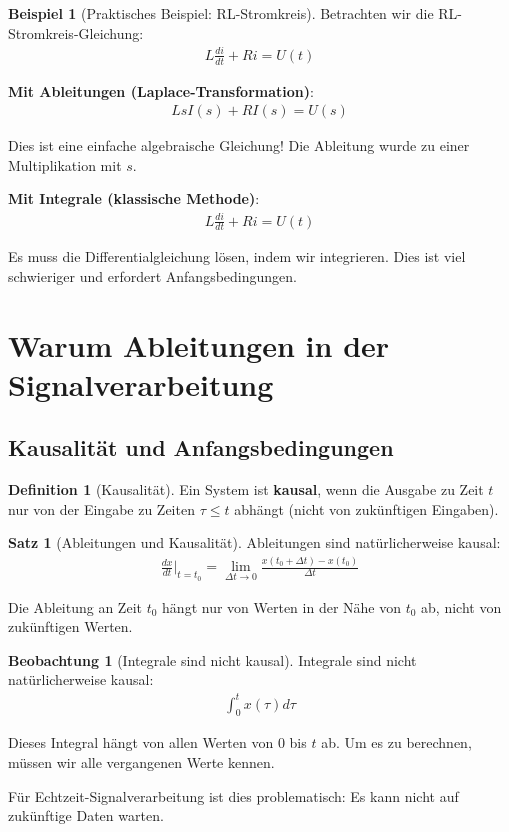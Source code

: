 ﻿\documentclass[a4paper,12pt]{report}
\theoremstyle{definition}
\newtheorem{definition}{Definition}
\newtheorem{beispiel}{Beispiel}
\newtheorem{satz}{Satz}
\newtheorem{beobachtung}{Beobachtung}
\begin{document}
	\begin{beispiel}[Praktisches Beispiel: RL-Stromkreis]
		Betrachten wir die RL-Stromkreis-Gleichung:
		\begin{align}
			L \frac{di}{dt} + R i = U(t)
		\end{align}
		
		\textbf{Mit Ableitungen (Laplace-Transformation)}:
		\begin{align}
			L s I(s) + R I(s) = U(s)
		\end{align}
		
		Dies ist eine einfache algebraische Gleichung! Die Ableitung wurde zu einer Multiplikation mit $s$.
		
		\textbf{Mit Integrale (klassische Methode)}:
		\begin{align}
			L \frac{di}{dt} + R i = U(t)
		\end{align}
		
		Es muss die Differentialgleichung lösen, indem wir integrieren. Dies ist viel schwieriger und erfordert Anfangsbedingungen.
	\end{beispiel}
	
	\section{Warum Ableitungen in der Signalverarbeitung}
	
	\subsection{Kausalität und Anfangsbedingungen}
	
	\begin{definition}[Kausalität]
		Ein System ist \textbf{kausal}, wenn die Ausgabe zu Zeit $t$ nur von der Eingabe zu Zeiten $\tau \leq t$ abhängt (nicht von zukünftigen Eingaben).
	\end{definition}
	
	\begin{satz}[Ableitungen und Kausalität]
		Ableitungen sind natürlicherweise kausal:
		\begin{align}
			\frac{dx}{dt}\bigg|_{t=t_0} = \lim_{\Delta t \to 0} \frac{x(t_0 + \Delta t) - x(t_0)}{\Delta t}
		\end{align}
		
		Die Ableitung an Zeit $t_0$ hängt nur von Werten in der Nähe von $t_0$ ab, nicht von zukünftigen Werten.
	\end{satz}
	
	\begin{beobachtung}[Integrale sind nicht kausal]
		Integrale sind nicht natürlicherweise kausal:
		\begin{align}
			\int_0^t x(\tau) d\tau
		\end{align}
		
		Dieses Integral hängt von allen Werten von $0$ bis $t$ ab. Um es zu berechnen, müssen wir alle vergangenen Werte kennen.
		
		Für Echtzeit-Signalverarbeitung ist dies problematisch: Es kann nicht auf zukünf\-tige Daten warten.
	\end{beobachtung}
	
\end{document}
